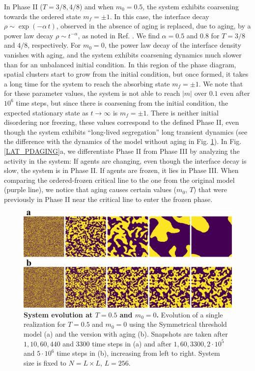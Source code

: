 In Phase II ($T=3/8, 4/8$) and when $m_0=0.5$, the system exhibits coarsening towards the ordered state $m_f=\pm 1$. In this case, the interface decay $\rho \sim \exp(-\alpha \, t)$, observed in the absence of aging is replaced, due to aging, by a power law decay $\rho \sim t^{-\alpha}$, as noted in Ref. \cite{Abella-2022-AME}. We find $\alpha=0.5$ and $0.8$ for $T=3/8$ and $4/8$, respectively. For $m_0=0$, the power law decay of the interface density vanishes with aging, and the system exhibits coarsening dynamics much slower than for an unbalanced initial condition. In this region of the phase diagram, spatial clusters start to grow from the initial condition, but once formed, it takes a long time for the system to reach the absorbing state $m_f = \pm 1$. 
We note that for these parameter values, the system is not able to reach $|m|$ over $0.1$ even after $10^6$ time steps, but since there is coarsening from the initial condition, the expected stationary state as $t \to \infty$ is $m_f=\pm1$. There is neither initial disordering nor freezing, these values correspond to the defined Phase II, even though the system exhibits ``long-lived segregation'' long transient dynamics (see the difference with the dynamics of the model without aging in Fig. \ref{fig:snapshots}). In Fig. \ref{LAT_PDAGING}a, we differentiate Phase II from Phase III by analyzing the activity in the system: If agents are changing, even though the interface decay is slow, the system is in Phase II. If agents are frozen, it lies in Phase III. When comparing the ordered-frozen critical line to the one from the original model (purple line), we notice that aging causes certain values ($m_0$, $T$) that were previously in Phase II near the critical line to enter the frozen phase.

\begin{figure}
        \centering
        \includegraphics[width=\linewidth]{Figs/Aging_STM/FIG13.pdf}
        \caption{\label{fig:snapshots} \textbf{System evolution at $T = 0.5$ and $m_0 = 0$.} Evolution of a single realization for $T = 0.5$ and $m_0 = 0$ using the Symmetrical threshold model (a) and the version with aging (b). Snapshots are taken after $1,10,60,440$ and $3300$ time steps in (a) and after $1,60,3300,2 \cdot 10^5$ and $5 \cdot 10^6$ time steps in (b), increasing from left to right. System size is fixed to $N = L \times L$, $L = 256$.}
\end{figure}

